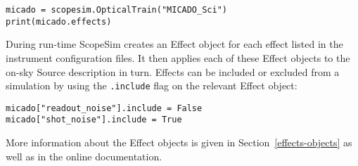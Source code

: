 \begin{lstlisting}[frame=single]
micado = scopesim.OpticalTrain("MICADO_Sci")
print(micado.effects)
\end{lstlisting}

During run-time ScopeSim creates an Effect object for each effect listed in the instrument configuration files.
It then applies each of these Effect objects to the on-sky Source description in turn.
Effects can be included or excluded from a simulation by using the \lstinline{.include} flag on the relevant Effect object:

\begin{lstlisting}[frame=single]
micado["readout_noise"].include = False
micado["shot_noise"].include = True
\end{lstlisting}

More information about the Effect objects is given in Section~\ref{effects-objects} as well as in the online documentation.
